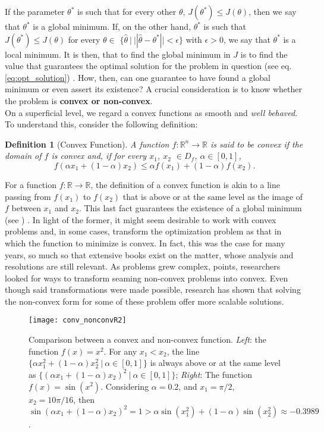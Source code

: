 \documentclass{article}
\newtheorem{definition}{Definition}
\newcommand{\rnums}{\mathbb{R}}
\begin{document}
	If the parameter $\theta^*$ is such that for every other $\theta$, $J(\theta^*) \leq J(\theta)$, then we say that $\theta^*$ is a global minimum. If, on the other hand, $\theta^*$ is such that $J(\theta^*) \leq J(\theta)$ for every $\theta \in$ $\{\hat\theta \ | \  ||\hat\theta - \theta^*|| < \epsilon\}$ with $\epsilon > 0$, we say that $\theta^*$ is a local minimum. It is then, that to find the global minimum in $J$ is to find the value that guarantees the optimal solution for the problem in question (see eq. \ref{eq:opt_solution}) . How, then, can one guarantee to have found a global minimum or even assert its existence? A crucial consideration is to know whether the problem is \textbf{convex or non-convex}.\\
		
	On a superficial level, we regard a convex functions as smooth and \textit{well behaved}. To understand this, consider the following definition:
	
	\begin{definition}[Convex Function]
		A function $f:\rnums^n \to \rnums$ is said to be convex if the domain of $f$ is convex and, if for every $x_1$, $x_2$ $\in D_{f}$, $\alpha \in [0, 1]$,
		\begin{equation}
 			f(\alpha x_1 + (1-\alpha)x_2) \leq \alpha f(x_1) + (1 - \alpha) f(x_2).
		\end{equation}
	\end{definition}
	
	For a function $f: \rnums \to \rnums$, the definition of a convex function is akin to a line passing from $f(x_1)$ to $f(x_2)$ that is above or at the same level as the image of $f$ between $x_1$ and $x_2$. This last fact guarantees the existence of a global minimum (see \cite{boyd}) . In light of the former, it might seem desirable to work with convex problems and, in some cases, transform the optimization problem as that in which the function to minimize is convex. In fact, this was the case for many years, so much so that extensive books exist on the matter, whose analysis and resolutions are still relevant. As problems grew complex, \cite{Jain-Kar} points, researchers looked for ways to transform seaming non-convex problems into convex. Even though said transformations were made possible, research has shown that solving the non-convex form for some of these problem offer more scalable solutions.\\
	
	\begin{figure}
		\centering
		\texttt{[image: conv\_nonconvR2]}
		\caption{Comparison between a convex and non-convex function. \textit{Left}: the function $f(x) = x^2$. For any $x_1 < x_2$, the line $\{\alpha x_1^2  + (1 - \alpha) x_2^2 \ | \ \alpha \in [0,1]\}$ is always above or at the same level as $\{(\alpha x_1  + (1 - \alpha) x_2)^2 \ | \ \alpha \in [0,1]\}$; \textit{Right}: The function $f(x) = \sin(x^2)$. Considering $\alpha = 0.2$, and $x_1 = \pi / 2$, $x_2 = 10 \pi / 16$, then $\sin(\alpha x_1 + (1 - \alpha) x_2)^2 = 1 > \alpha \sin(x_1 ^ 2) + (1 - \alpha) \sin(x_2^2) \approx -0.3989$.}
		\label{fig:conv_nonconvr2}
	\end{figure}
		
\end{document}
